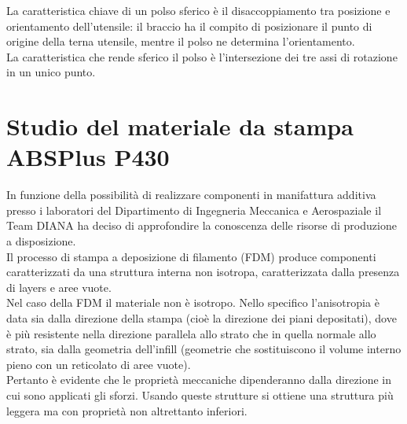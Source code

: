 \documentclass[%
corpo=11pt,
twoside,
 stile=classica,
oldstyle,
greek,%
]{toptesi}
\begin{document}
	La caratteristica chiave di un polso sferico è il disaccoppiamento tra posizione e orientamento dell'utensile: il braccio ha il compito di posizionare il punto di origine della terna utensile, mentre il polso ne determina l'orientamento.\\
	La caratteristica che rende sferico il polso è l'intersezione dei tre assi di rotazione in un unico punto.
	
	
	\section{Studio del materiale da stampa ABSPlus P430}
	In funzione della possibilità di realizzare componenti in manifattura additiva presso i laboratori  del Dipartimento di Ingegneria Meccanica e Aerospaziale il Team DIANA ha deciso di approfondire la conoscenza delle risorse di produzione a disposizione. \\
	Il processo di stampa a deposizione di filamento (FDM) produce componenti caratterizzati da una struttura interna non isotropa, caratterizzata dalla presenza di layers e aree vuote.\\ 
	Nel caso della FDM il materiale non è isotropo. Nello specifico l’anisotropia è data sia dalla direzione della stampa (cioè la direzione dei piani depositati), dove è più resistente nella direzione parallela allo strato che in quella normale allo strato, sia dalla geometria dell’infill (geometrie che sostituiscono il volume interno pieno con un reticolato di aree vuote).\\
	 Pertanto è evidente che le proprietà meccaniche dipenderanno dalla direzione in cui sono applicati gli sforzi. 
	 Usando queste strutture si ottiene una struttura più leggera ma con proprietà non altrettanto inferiori. 
	 
\end{document}
